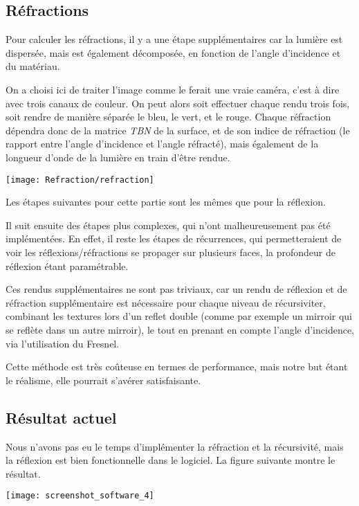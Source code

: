 \subsection{Réfractions}

Pour calculer les réfractions, il y a une étape supplémentaires car la lumière est dispersée,
mais est également décomposée, en fonction de l'angle d'incidence et du matériau.

On a choisi ici de traiter l'image comme le ferait une vraie caméra, c'est à dire
avec trois canaux de couleur.
On peut alors soit effectuer chaque rendu trois fois, soit rendre de manière séparée le bleu,
le vert, et le rouge. Chaque réfraction dépendra donc de la matrice \textit{TBN} de la
surface, et de son indice de réfraction (le rapport entre l'angle d'incidence et l'angle réfracté),
mais également de la longueur d'onde de la lumière en train d'être rendue.

\texttt{[image: Refraction/refraction]}

Les étapes suivantes pour cette partie sont les mêmes que pour la réflexion.

Il suit ensuite des étapes plus complexes, qui n'ont malheureusement pas été implémentées.
En effet, il reste les étapes de récurrences, qui permetteraient de voir les
réflexions/réfractions se propager sur plusieurs faces,
la profondeur de réflexion étant paramétrable.

Ces rendus supplémentaires ne sont pas triviaux, car un rendu de réflexion et de réfraction
supplémentaire est nécessaire pour chaque niveau de récursiviter, combinant les textures lors
d'un reflet double (comme par exemple un mirroir qui se reflète dans un autre mirroir), le tout
en prenant en compte l'angle d'incidence, via l'utilisation du Fresnel.

Cette méthode est très coûteuse en termes de performance,
mais notre but étant le réalisme, elle pourrait s'avérer satisfaisante.

\subsection{Résultat actuel}

Nous n'avons pas eu le temps d'implémenter la réfraction et la récursivité, mais
la réflexion est bien fonctionnelle dans le logiciel. La figure suivante
montre le résultat.

{\centering \texttt{[image: screenshot\_software\_4]}}

